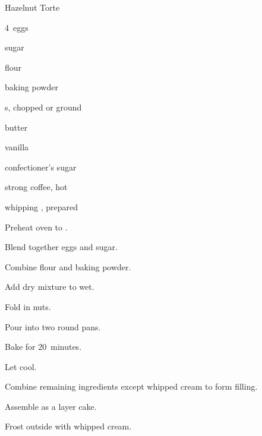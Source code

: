 \begin{recipe}{Hazelnut Torte}{}{}

\begin{ingredients}
\item 4~eggs
\item \C{\threequarter} sugar
\item {} flour
\item \Tp{2\half} baking powder
\item {} s, chopped or ground
\item {} butter
\item {} 
\item {} vanilla
\item {} confectioner's sugar
\item {} strong coffee, hot
\item whipping , prepared
\end{ingredients}

\begin{directions}
\item Preheat oven to .
\item Blend together eggs and sugar.
\item Combine flour and baking powder.
\item Add dry mixture to wet.
\item Fold in nuts.
\item Pour into two  round pans.
\item Bake for 20~minutes.
\item Let cool.
\item Combine remaining ingredients except whipped cream to form filling.
\item Assemble as a layer cake.
\item Frost outside with whipped cream.
\end{directions}

\end{recipe}

